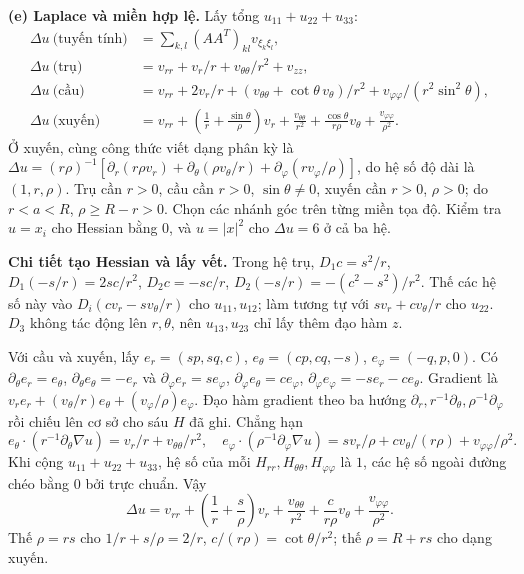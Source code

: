 \documentclass[10pt,a4paper]{article}
\begin{document}
\textbf{(e) Laplace và miền hợp lệ.} Lấy tổng $u_{11}+u_{22}+u_{33}$:
\begin{align*}
\Delta u\ \text{(tuyến tính)}&=\sum_{k,l}(AA^T)_{kl}v_{\xi_k\xi_l},\\
\Delta u\ \text{(trụ)}&=v_{rr}+v_r/r+v_{\theta\theta}/r^2+v_{zz},\\
\Delta u\ \text{(cầu)}&=v_{rr}+2v_r/r+(v_{\theta\theta}+\cot\theta\,v_\theta)/r^2+v_{\varphi\varphi}/(r^2\sin^2\theta),\\
\Delta u\ \text{(xuyến)}&=v_{rr}+\left(\frac1r+\frac{\sin\theta}{\rho}\right)v_r
+\frac{v_{\theta\theta}}{r^2}+\frac{\cos\theta}{r\rho}v_\theta+\frac{v_{\varphi\varphi}}{\rho^2}.
\end{align*}
Ở xuyến, cùng công thức viết dạng phân kỳ là $\Delta u=(r\rho)^{-1}[\partial_r(r\rho v_r)+\partial_\theta(\rho v_\theta/r)+\partial_\varphi(rv_\varphi/\rho)]$, do hệ số độ dài là $(1,r,\rho)$. Trụ cần $r>0$, cầu cần $r>0$, $\sin\theta\ne0$, xuyến cần $r>0$, $\rho>0$; do $r<a<R$, $\rho\ge R-r>0$. Chọn các nhánh góc trên từng miền tọa độ. Kiểm tra $u=x_i$ cho Hessian bằng $0$, và $u=|x|^2$ cho $\Delta u=6$ ở cả ba hệ.

\textbf{Chi tiết tạo Hessian và lấy vết.} Trong hệ trụ, $D_1c=s^2/r$, $D_1(-s/r)=2sc/r^2$, $D_2c=-sc/r$, $D_2(-s/r)=-(c^2-s^2)/r^2$. Thế các hệ số này vào $D_i(cv_r-sv_\theta/r)$ cho $u_{11},u_{12}$; làm tương tự với $sv_r+cv_\theta/r$ cho $u_{22}$. $D_3$ không tác động lên $r,\theta$, nên $u_{13},u_{23}$ chỉ lấy thêm đạo hàm $z$.

Với cầu và xuyến, lấy $e_r=(sp,sq,c)$, $e_\theta=(cp,cq,-s)$, $e_\varphi=(-q,p,0)$. Có $\partial_\theta e_r=e_\theta$, $\partial_\theta e_\theta=-e_r$ và $\partial_\varphi e_r=s e_\varphi$, $\partial_\varphi e_\theta=c e_\varphi$, $\partial_\varphi e_\varphi=-s e_r-c e_\theta$. Gradient là $v_re_r+(v_\theta/r)e_\theta+(v_\varphi/\rho)e_\varphi$. Đạo hàm gradient theo ba hướng $\partial_r,r^{-1}\partial_\theta,\rho^{-1}\partial_\varphi$ rồi chiếu lên cơ sở cho sáu $H$ đã ghi. Chẳng hạn
\[e_\theta\cdot(r^{-1}\partial_\theta\nabla u)=v_r/r+v_{\theta\theta}/r^2,\quad
e_\varphi\cdot(\rho^{-1}\partial_\varphi\nabla u)
=sv_r/\rho+cv_\theta/(r\rho)+v_{\varphi\varphi}/\rho^2.\]
Khi cộng $u_{11}+u_{22}+u_{33}$, hệ số của mỗi $H_{rr},H_{\theta\theta},H_{\varphi\varphi}$ là $1$, các hệ số ngoài đường chéo bằng $0$ bởi trực chuẩn. Vậy
\[\Delta u=v_{rr}+\left(\frac1r+\frac s\rho\right)v_r+
\frac{v_{\theta\theta}}{r^2}+\frac c{r\rho}v_\theta+\frac{v_{\varphi\varphi}}{\rho^2}.\]
Thế $\rho=rs$ cho $1/r+s/\rho=2/r$, $c/(r\rho)=\cot\theta/r^2$; thế $\rho=R+rs$ cho dạng xuyến.
\end{document}
